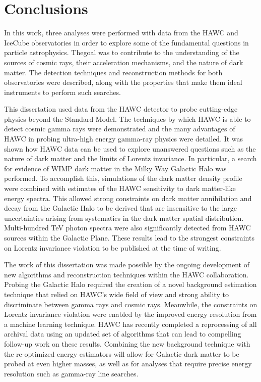 \section{Conclusions \label{sec:conclusions}}

In this work, three analyses were performed with data from the HAWC and IceCube observatories in order to explore some of the fundamental questions in particle astrophysics.
Thegoal was to contribute to the understanding of the sources of cosmic rays, their acceleration mechanisms, and the nature of dark matter. The detection techniques and reconstruction methods for both observatories were described, along with the properties that make them ideal instruments to perform such searches.

This dissertation used data from the HAWC detector to probe cutting-edge physics beyond the Standard Model.
The techniques by which HAWC is able to detect cosmic gamma rays were
demonstrated and the many advantages of HAWC in probing ultra-high energy gamma-ray physics were detailed.
It was shown how HAWC data can be used to explore unanswered questions such as the nature of dark matter and the limits of Lorentz invariance.
In particular, a search for evidence of WIMP dark matter in the Milky Way Galactic Halo was performed.
To accomplish this, simulations of the dark matter density profile were combined with estimates of the HAWC sensitivity to dark matter-like energy spectra.
This allowed strong constraints on dark matter annihilation and decay from the Galactic Halo to be derived that are insensitive to the large uncertainties arising from systematics in the dark matter spatial distribution.
Multi-hundred TeV photon spectra were also significantly detected from HAWC sources within the Galactic Plane. These results lead to the strongest constraints on Lorentz invariance violation to be published at the time of writing.

The work of this dissertation was made possible by the ongoing development of new algorithms and reconstruction techniques within the HAWC collaboration.
Probing the Galactic Halo required the creation of a novel background estimation technique that relied on HAWC’s wide field of view and strong ability to discriminate between gamma rays and cosmic rays.
Meanwhile, the constraints on Lorentz invariance violation were enabled by the improved energy resolution from a machine learning technique.
HAWC has recently completed a reprocessing of all archival data using an updated set of algorithms that can lead to compelling follow-up work on these results.
Combining the new background technique with the re-optimized energy estimators will allow for Galactic dark matter to be probed at even higher masses, as well as for analyses that require precise energy resolution such as gamma-ray line searches.

